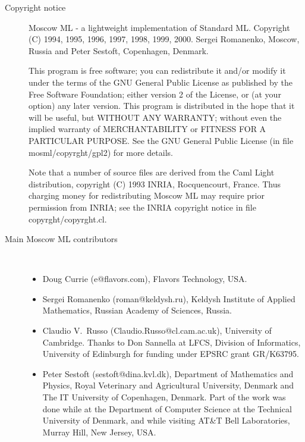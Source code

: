 \documentclass[fleqn]{article}
\begin{document}
\begin{description}
\item[Copyright notice] Moscow ML - a lightweight implementation of
  Standard ML\@.  Copyright (C) 1994, 1995, 1996, 1997, 1998, 1999,
  2000.  Sergei Romanenko, Moscow, Russia and Peter Sestoft,
  Copenhagen, Denmark.
  
  This program is free software; you can redistribute it and/or modify
  it under the terms of the GNU General Public License as published by
  the Free Software Foundation; either version 2 of the License, or
  (at your option) any later version.  This program is distributed in
  the hope that it will be useful, but WITHOUT ANY WARRANTY; without
  even the implied warranty of MERCHANTABILITY or FITNESS FOR A
  PARTICULAR PURPOSE.  See the GNU General Public License (in file
  mosml/copyrght/gpl2) for more details.    

Note that a number of source files are derived from the Caml Light
distribution, copyright (C) 1993 INRIA, Rocquencourt, France.
Thus charging money for redistributing Moscow ML may require prior
permission from INRIA; see the INRIA copyright notice in file
copyrght/copyrght.cl.\\[2ex]


\item[Main Moscow ML contributors]\mbox{ }
  \begin{itemize}
  \item Doug Currie (e@flavors.com), Flavors Technology, USA.
  \item Sergei Romanenko (roman@keldysh.ru), Keldysh Institute of
    Applied Mathematics, Russian Academy of Sciences, Russia.
  \item Claudio V.\ Russo (Claudio.Russo@cl.cam.ac.uk), University of
    Cambridge.  Thanks to Don Sannella at LFCS, Division of
    Informatics, University of Edinburgh for funding under EPSRC grant
    GR/K63795.
  \item Peter Sestoft (sestoft@dina.kvl.dk), Department of Mathematics
    and Physics, Royal Veterinary and Agricultural University, Denmark
    and The IT University of Copenhagen, Denmark.  Part of the work
    was done while at the Department of Computer Science at the
    Technical University of Denmark, and while visiting AT\&T 
    Bell Laboratories, Murray Hill, New Jersey, USA.
  \end{itemize}


\end{description}
\end{document}
